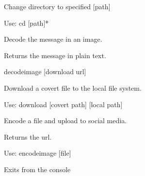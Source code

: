 \documentclass[letterpaper,12pt,openany,oneside]{sphinxmanual}
\begin{document}
\begin{fulllineitems}
\begin{fulllineitems}
\end{fulllineitems}


\begin{fulllineitems}
\label{main:main.Console.do_cd}
Change directory to specified {[}path{]}

Use: cd {[}path{]}*

\end{fulllineitems}


\begin{fulllineitems}
\label{main:main.Console.do_decodeimage}
Decode the message in an image.

Returns the message in plain text.

decodeimage {[}download url{]}

\end{fulllineitems}


\begin{fulllineitems}
\label{main:main.Console.do_download}
Download a covert file to the local file system.

Use: download {[}covert path{]} {[}local path{]}

\end{fulllineitems}


\begin{fulllineitems}
\label{main:main.Console.do_encodeimage}
Encode a file and upload to social media.

Returns the url.

Use: encodeimage {[}file{]}

\end{fulllineitems}


\begin{fulllineitems}
\label{main:main.Console.do_exit}
Exits from the console


\end{fulllineitems}
\end{fulllineitems}
\end{document}
